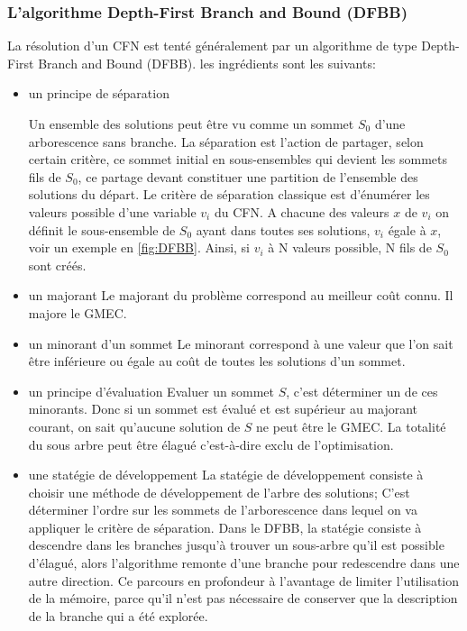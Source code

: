 \subsubsection{L'algorithme \og Depth-First Branch and Bound \fg (DFBB)}

La résolution d'un CFN est tenté généralement par un algorithme de type  \og Depth-First Branch and Bound \fg (DFBB).
les ingrédients sont les suivants:
\begin{itemize}
\item un principe de séparation

Un ensemble des solutions peut être vu comme un sommet $S_0$ d'une arborescence sans branche.  
La séparation est l'action de partager, selon certain critère, ce sommet initial en sous-ensembles  qui devient les sommets fils de $S_0$, ce partage devant constituer une partition de l'ensemble des solutions du départ.
Le critère de séparation classique est d'énumérer les valeurs possible d'une variable $v_i$ du  CFN. A chacune des valeurs $x$ de $v_i$ on définit le sous-ensemble de $S_0$ ayant dans toutes ses solutions, $v_i$ égale à $x$, voir un exemple en \ref{fig:DFBB}. Ainsi, si $v_i$ à N valeurs possible, N fils de $S_0$ sont créés.
\item un majorant
 Le majorant du problème correspond au meilleur coût connu. Il majore le GMEC.
\item un minorant d'un sommet
Le minorant correspond à une valeur que l'on sait être inférieure ou égale au coût de toutes les solutions d'un sommet.  
\item un principe d'évaluation
Evaluer un sommet $S$, c'est déterminer un de ces minorants. Donc si un sommet est évalué et est supérieur au majorant courant, on sait qu'aucune solution de $S$ ne peut être le GMEC. La totalité du sous arbre peut être élagué c'est-à-dire exclu de l'optimisation.  

\item une statégie de développement
La statégie de développement consiste à choisir une méthode de développement de l'arbre des solutions; C'est déterminer l'ordre sur les sommets de l'arborescence dans lequel on va appliquer le critère de séparation.
Dans le DFBB, la statégie consiste à descendre dans les branches jusqu'à trouver un sous-arbre qu'il est possible d'élagué, alors l'algorithme remonte d'une branche pour redescendre dans une autre direction. Ce parcours en profondeur à l'avantage de limiter l'utilisation de la mémoire, parce qu'il n'est pas nécessaire de conserver que la description de la branche qui a été explorée.  
\end{itemize}  



